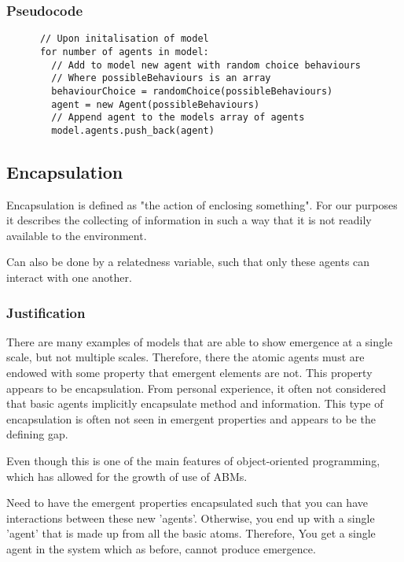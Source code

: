 \documentclass{article}
\begin{document}
    \subsubsection{Pseudocode}
      
      \begin{verbatim}
      // Upon initalisation of model
      for number of agents in model:
        // Add to model new agent with random choice behaviours
        // Where possibleBehaviours is an array
        behaviourChoice = randomChoice(possibleBehaviours) 
        agent = new Agent(possibleBehaviours)
        // Append agent to the models array of agents
        model.agents.push_back(agent)
      \end{verbatim}


  \subsection{Encapsulation}
  \label{sec: encap}
      
    Encapsulation is defined as "the action of enclosing something". For our purposes it describes the collecting of information in such a way that it is not readily available to the environment.

    Can also be done by a relatedness variable, such that only these agents can interact with one another.

    \subsubsection{Justification}
      There are many examples of models that are able to show emergence at a single scale, but not multiple scales. Therefore, there the atomic agents must are endowed with some property that emergent elements are not. This property appears to be encapsulation. From personal experience, it often not considered that basic agents implicitly encapsulate method and information. This type of encapsulation is often not seen in emergent properties and appears to be the defining gap.

      Even though this is one of the main features of object-oriented programming, which has allowed for the growth of use of ABMs. 

        Need to have the emergent properties encapsulated such that you can have interactions between these new 'agents'. Otherwise, you end up with a single 'agent' that is made up from all the basic atoms. Therefore, You get a single agent in the system which as before, cannot produce emergence. 
\end{document}
